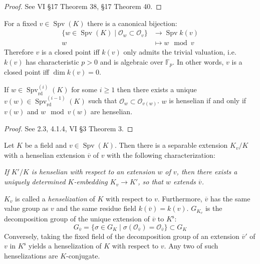 \begin{proof}
See \cite{ZS60} VI §17 Theorem 38, §17 Theorem 40.
\end{proof}

\begin{lemma}\label{2.2-pre}
For a fixed $v\in \operatorname{Spv}(K)$ there is a canonical bijection: 
\begin{align*}
\{ w\in\operatorname{Spv}(K)\mid \mathcal{O}_w\subset\mathcal{O}_v \} &\longrightarrow \operatorname{Spv}k(v)\\ 
w&\longmapsto w\mod v
\end{align*}
Therefore $v$ is a closed point iff $k(v)$ only admits the trivial valuation, i.e. $k(v)$ has characteristic $p>0$ and is algebraic over $\mathbb{F}_p$. In other words, $v$ is a closed point iff $\dim k(v)=0$.

If $w\in\operatorname{Spv}_\text{rd}^{(i)}(K)$ for some $i\geq 1$ then there exists a unique $v(w)\in\operatorname{Spv}_\text{rd}^{(i-1)}(K)$ such that $\mathcal{O}_w\subset\mathcal{O}_{v(w)}$. $w$ is henselian if and only if $v(w)$ and $w\mod v(w)$ are henselian.
\end{lemma}

\begin{proof}
See \cite{EP05} 2.3, 4.1.4, \cite{ZS60} VI §3 Theorem 3.
\end{proof}

\begin{theorem}\label{theorem-henselization}
Let $K$ be a field and $v\in\operatorname{Spv}(K)$. Then there is a separable extension $K_v/K$ with a henselian extension $\overline{v}$ of $v$ with the following characterization:

\textit{If $K'/K$ is henselian with respect to an extension $w$ of $v$, then there exists a uniquely determined $K$-embedding $K_v\to K'$, so that $w$ extends $\overline{v}$.}

$K_v$ is called a \textit{henselization} of $K$ with respect to $v$. Furthermore, $\overline{v}$ has the same value group as $v$ and the same residue field $k(\overline{v}) = k(v)$. $G_{K_v}$ is the decomposition group of the unique extension of $\overline{v}$ to $K^\text{s}$:
\[ G_{\overline{v}} = \{ \sigma\in G_K\mid \sigma(\mathcal{O}_{\overline{v}}) =\mathcal{O}_{\overline{v}} \} \subset G_K \]
Conversely, taking the fixed field of the decomposition group of an extension $\overline{v}'$ of $v$ in $K^\text{s}$ yields a henselization of $K$ with respect to $v$. Any two of such henselizations are $K$-conjugate.
\end{theorem}

